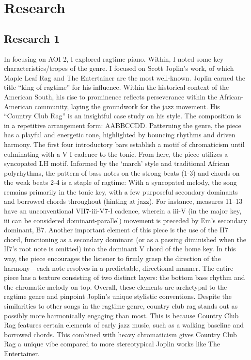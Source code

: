 \documentclass[11pt,a4paper]{article}
\begin{document}
\section{Research}

\subsection{Research 1}

In focusing on AOI 2, I explored ragtime piano. Within, I noted some key characteristics/tropes of the genre. I focused on Scott Joplin’s work, of which Maple Leaf Rag and The Entertainer are the most well-known. Joplin earned the title “king of ragtime” for his influence. Within the historical context of the American South, his rise to prominence reflects perseverance within the African-American community, laying the groundwork for the jazz movement.
His “Country Club Rag” is an insightful case study on his style. The composition is in a repetitive arrangement form: AABBCCDD. Patterning the genre, the piece has a playful and energetic tone, highlighted by bouncing rhythms and driven harmony. The first four introductory bars establish a motif of chromaticism until culminating with a V-I cadence to the tonic. From here, the piece utilizes a syncopated LH motif. Informed by the ‘march’ style and traditional African polyrhythms, the pattern of bass notes on the strong beats (1-3) and chords on the weak beats 2-4 is a staple of ragtime: With a syncopated melody, the song remains primarily in the tonic key, with a few purposeful secondary dominants and borrowed chords throughout (hinting at jazz). For instance, measures 11–13 have an unconventional VII7-iii-V7-I cadence, wherein a iii-V (in the major key, iii can be considered dominant-parallel) movement is preceded by Em's secondary dominant, B7. Another important element of this piece is the use of the II7 chord, functioning as a secondary dominant (or as a passing diminished when the II7’s root note is omitted) into the dominant V chord of the home key. In this way, the piece encourages the listener to firmly grasp the direction of the harmony—each note resolves in a predictable, directional manner. The entire piece has a texture consisting of two distinct layers: the bottom bass rhythm and the chromatic melody on top. Overall, these elements are archetypal to the ragtime genre and pinpoint Joplin’s unique stylistic conventions. Despite the similarities to other songs in the ragtime genre, country club rag stands out as possibly more harmonically engaging than most. This is because Country Club Rag features certain elements of early jazz music, such as a walking baseline and borrowed chords. This combined with heavy chromaticism gives Country Club Rag a unique vibe compared to more stereotypical Joplin works like The Entertainer.\autocite{joplin}
\end{document}

